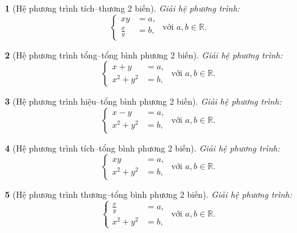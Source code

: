 \documentclass{article}
\newtheorem{baitoan}{}
\begin{document}
\begin{baitoan}[Hệ phương trình tích--thương 2 biến]
	Giải hệ phương trình:
	\begin{equation}
		\left\{\begin{split}
			xy &= a,\\
			\frac{x}{y} &= b,
		\end{split}\right.\mbox{ với }	a,b\in\mathbb{R}.
	\end{equation}
\end{baitoan}

\begin{baitoan}[Hệ phương trình tổng--tổng bình phương 2 biến]
	Giải hệ phương trình:
	\begin{equation}
		\left\{\begin{split}
			x + y &= a,\\
			x^2 + y^2 &= b,
		\end{split}\right.\mbox{ với }	a,b\in\mathbb{R}.
	\end{equation}
\end{baitoan}

\begin{baitoan}[Hệ phương trình hiệu--tổng bình phương 2 biến]
	Giải hệ phương trình:
	\begin{equation}
		\left\{\begin{split}
			x - y &= a,\\
			x^2 + y^2 &= b,
		\end{split}\right.\mbox{ với }	a,b\in\mathbb{R}.
	\end{equation}
\end{baitoan}

\begin{baitoan}[Hệ phương trình tích--tổng bình phương 2 biến]
	Giải hệ phương trình:
	\begin{equation}
		\left\{\begin{split}
			xy &= a,\\
			x^2 + y^2 &= b,
		\end{split}\right.\mbox{ với }	a,b\in\mathbb{R}.
	\end{equation}
\end{baitoan}

\begin{baitoan}[Hệ phương trình thương--tổng bình phương 2 biến]
	Giải hệ phương trình:
	\begin{equation}
		\left\{\begin{split}
			\frac{x}{y} &= a,\\
			x^2 + y^2 &= b,
		\end{split}\right.\mbox{ với }	a,b\in\mathbb{R}.
	\end{equation}
\end{baitoan}
\end{document}
